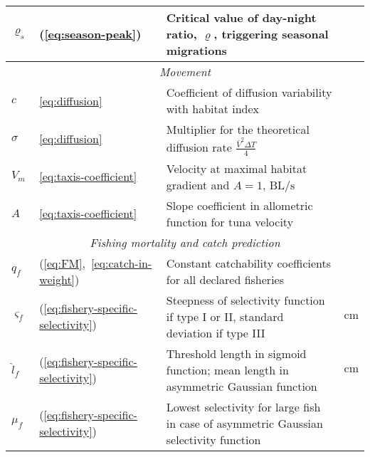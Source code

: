 \begin{longtable}{p{.75cm}p{1.5cm}p{11cm}p{1.5cm}}
    $\varrho_s$ &(\ref{eq:season-peak}) & Critical value of day-night ratio, $\varrho$, triggering seasonal migrations& \\
\hline
  \multicolumn{4}{c}{\textit{ Movement}} \\
\hline
    $c$ &\eqref{eq:diffusion} & {Coefficient of diffusion variability with habitat index}&\\
    $\sigma$ &\eqref{eq:diffusion}& {Multiplier for the theoretical diffusion rate $\frac{{\bar{V}}^2 \Delta T}{4}$}& \\
    $V_m$ &\eqref{eq:taxis-coefficient} & {Velocity at maximal habitat gradient and $A=1$, $\text{BL}/\text{s}$}& \\
    $A$ &\eqref{eq:taxis-coefficient} &{Slope coefficient in allometric function for tuna velocity}&\\
\hline
     \multicolumn{4}{c}{\textit{ Fishing mortality and catch prediction}} \\
\hline
    $q_f$ &(\ref{eq:FM},~\ref{eq:catch-in-weight})   & Constant catchability coefficients for all declared fisheries&\\
    $\varsigma_f$ &(\ref{eq:fishery-specific-selectivity})  & Steepness of selectivity function if type I or II, standard deviation if type III&$\text{cm}$\\
    $\hat{l}_f$ & (\ref{eq:fishery-specific-selectivity})  & Threshold length in sigmoid function; mean length in asymmetric Gaussian function &$\text{cm}$ \\
    $\mu_f$ &(\ref{eq:fishery-specific-selectivity}) & Lowest selectivity for large fish in case of asymmetric Gaussian selectivity function&\\		
\hline        
\end{longtable}
